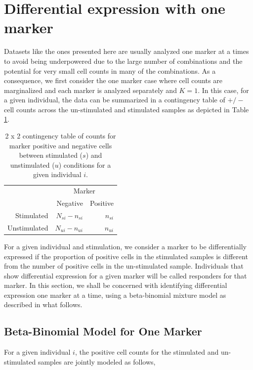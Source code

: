 \documentclass[11pt]{article}
\begin{document}
\section{Differential expression with one marker}
Datasets like the ones presented here are usually analyzed one marker at a times to avoid being underpowered due to the large number of combinations and the potential for very small cell counts in many of the combinations. As a consequence, we first consider the one marker case where cell counts are marginalized and each marker is analyzed separately and $K=1$. In this case, for a given individual, the data can be summarized in a contingency table of $+/-$ cell counts across the un-stimulated and stimulated samples as depicted in Table \ref{tab:twobytwo}.

\begin{table}[ht]
\centering
\parbox{0.8\linewidth}{
\caption{2 x 2 contingency table of counts for marker positive and negative cells between stimulated ($s$) and unstimulated ($u$) conditions for a given individual $i$.}\label{tab:twobytwo}
\centering
\begin{tabular}{rrr}

  \hline
\multicolumn{1}{l}{}&
\multicolumn{2}{c}{Marker}\\
 & Negative & Positive \\ 
  \hline
Stimulated &   $N_{si} - n_{si}$ &   $n_{si}$ \\ 
Unstimulated &   $N_{ui}-n_{ui}$ &   $n_{ui}$ \\ 
   \hline
\end{tabular}
}
\end{table}
For a given individual and stimulation, we consider a marker to be differentially expressed if the proportion of positive cells in the stimulated samples is different from the number of positive cells in the un-stimulated sample. Individuals that show differential expression for a given marker will be called responders for that marker. In this section, we shall be concerned with identifying differential expression one marker at a time, using a beta-binomial mixture model as described in what follows. 

\subsection{Beta-Binomial Model for One Marker}
For a given individual $i$, the positive cell counts for the stimulated and un-stimulated samples are jointly modeled as follows,
\end{document}
